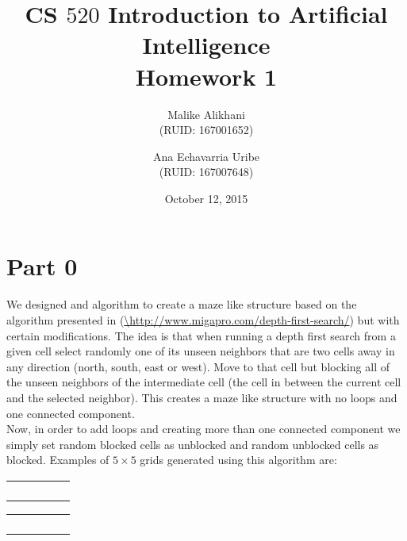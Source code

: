 \documentclass{article}
\begin{document}
\title{CS $520$ Introduction to Artificial Intelligence \\ Homework 1 }
\date{October 12, 2015}
\author{Malike Alikhani \\ \small{(RUID: 167001652)} \and Ana Echavarria Uribe \\ \small{(RUID: 167007648)}}

\maketitle

\section*{Part 0}

We designed and algorithm to create a maze like structure based on the algorithm presented in (\url{\http://www.migapro.com/depth-first-search/}) but with certain modifications. The idea is that when running a depth first search from a given cell select randomly one of its unseen neighbors that are two cells away in any direction (north, south, east or west). Move to that cell but blocking all of the unseen neighbors of the intermediate cell (the cell in between the current cell and the selected neighbor). This creates a maze like structure with no loops and one connected component.\\
Now, in order to add loops and creating more than one connected component we simply set random blocked cells as unblocked and random unblocked cells as blocked.
Examples of $5 \times 5$ grids generated using this algorithm are:

\newcommand{\bl}{\cellcolor{black!100}}
\begin{multicols}{2}
  \begin{center}
    \begin{tabular}{|*{5}{c|}}
      \hline
      \bl & & \bl & & \bl \\ \hline
      \bl & & \bl & & \bl \\ \hline
      & & & \bl & \bl \\ \hline
      \bl &  & \bl & \bl & \\ \hline
      \bl & & & & \bl \\ \hline
    \end{tabular}
    
    \begin{tabular}{|*{5}{c|}}
      \hline
      & \bl & \bl & & \bl \\ \hline
      & & & \bl & \bl \\ \hline
      & \bl & & &  \\ \hline
      &  &  & \bl & \\ \hline
      & \bl & \bl & \bl & \bl \\ \hline
    \end{tabular}
  \end{center}
\end{multicols}
\end{document}

